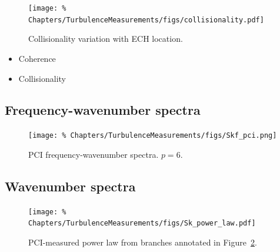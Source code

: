 \begin{figure}
  \centering
  \texttt{[image: \%
    Chapters/TurbulenceMeasurements/figs/collisionality.pdf]}
  \caption[Collisionality variation with ECH location]{%
    Collisionality variation with ECH location.
  }
\label{fig:TurbulenceMeasurements:collisionality}
\end{figure}

\begin{itemize}
  \item Coherence
  \item Collisionality
\end{itemize}


\subsection{Frequency-wavenumber spectra}
\label{sec:TurbulenceMeasurements:Skf}

\begin{figure}
  \centering
  \texttt{[image: \%
    Chapters/TurbulenceMeasurements/figs/Skf\_pci.png]}
  \caption[PCI frequency-wavenumber spectra]{%
    PCI frequency-wavenumber spectra. $p = 6$.
  }
\label{fig:TurbulenceMeasurements:Skf_pci}
\end{figure}


\subsection{Wavenumber spectra}
\label{sec:TurbulenceMeasurements:Sk}
\begin{figure}
  \centering
  \texttt{[image: \%
    Chapters/TurbulenceMeasurements/figs/Sk\_power\_law.pdf]}
  \caption[PCI-measured power law]{%
    PCI-measured power law from branches annotated in
    Figure~\ref{fig:TurbulenceMeasurements:Skf_pci}.
  }
\label{fig:TurbulenceMeasurements:Sk_power_law}
\end{figure}


